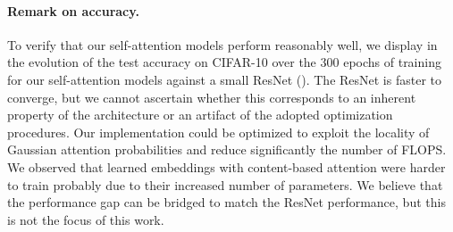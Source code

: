 \documentclass{article} \usepackage{iclr2020_conference,times}
\begin{document}
\begin{figure}
\begin{floatrow}
\end{floatrow}
\end{figure}

\vspace{-2mm}
\paragraph{Remark on accuracy.}
To verify that our self-attention models perform reasonably well, we display in  the evolution of the test accuracy on CIFAR-10 over the 300 epochs of training for our self-attention models against a small ResNet ().
The ResNet is faster to converge, but we cannot ascertain whether this corresponds to an inherent property of the architecture or an artifact of the adopted optimization procedures.
Our implementation could be optimized to exploit the locality of Gaussian attention probabilities and reduce significantly the number of FLOPS.
We observed that learned embeddings with content-based attention were harder to train probably due to their increased number of parameters.
We believe that the performance gap can be bridged to match the ResNet performance, but this is not the focus of this work.
\end{document}
